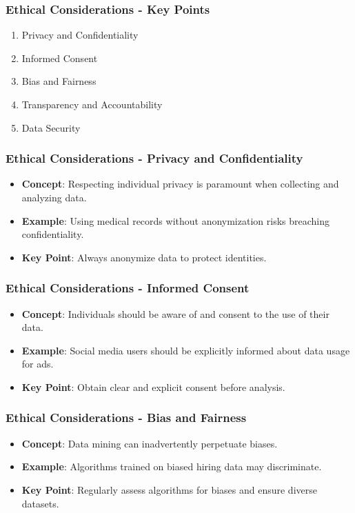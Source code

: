 \documentclass{beamer}
\begin{document}
\begin{frame}[fragile]
    \frametitle{Ethical Considerations - Key Points}
    \begin{enumerate}
        \item Privacy and Confidentiality
        \item Informed Consent
        \item Bias and Fairness
        \item Transparency and Accountability
        \item Data Security
    \end{enumerate}
\end{frame}

\begin{frame}[fragile]
    \frametitle{Ethical Considerations - Privacy and Confidentiality}
    \begin{itemize}
        \item \textbf{Concept}: Respecting individual privacy is paramount when collecting and analyzing data.
        \item \textbf{Example}: Using medical records without anonymization risks breaching confidentiality.
        \item \textbf{Key Point}: Always anonymize data to protect identities.
    \end{itemize}
\end{frame}

\begin{frame}[fragile]
    \frametitle{Ethical Considerations - Informed Consent}
    \begin{itemize}
        \item \textbf{Concept}: Individuals should be aware of and consent to the use of their data.
        \item \textbf{Example}: Social media users should be explicitly informed about data usage for ads.
        \item \textbf{Key Point}: Obtain clear and explicit consent before analysis.
    \end{itemize}
\end{frame}

\begin{frame}[fragile]
    \frametitle{Ethical Considerations - Bias and Fairness}
    \begin{itemize}
        \item \textbf{Concept}: Data mining can inadvertently perpetuate biases.
        \item \textbf{Example}: Algorithms trained on biased hiring data may discriminate.
        \item \textbf{Key Point}: Regularly assess algorithms for biases and ensure diverse datasets.
    \end{itemize}
\end{frame}
\end{document}
